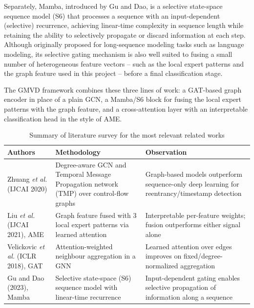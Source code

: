 \documentclass[12pt, a4paper, openright, twoside]{report}
\begin{document}
Separately, Mamba, introduced by Gu and Dao, is a selective state-space sequence model (S6) that processes a sequence with an input-dependent (selective) recurrence, achieving linear-time complexity in sequence length while retaining the ability to selectively propagate or discard information at each step. Although originally proposed for long-sequence modeling tasks such as language modeling, its selective gating mechanism is also well suited to fusing a small number of heterogeneous feature vectors -- such as the local expert patterns and the graph feature used in this project -- before a final classification stage.

The GMVD framework combines these three lines of work: a GAT-based graph encoder in place of a plain GCN, a Mamba/S6 block for fusing the local expert patterns with the graph feature, and a cross-attention layer with an interpretable classification head in the style of AME.

\begin{table}[h!]
\centering
\caption{Summary of literature survey for the most relevant related works}
\begin{tabular}{|p{3.6cm}|p{6cm}|p{4.5cm}|}
\hline
\textbf{Authors} & \textbf{Methodology} & \textbf{Observation} \\
\hline
Zhuang \textit{et al.} (IJCAI 2020) & Degree-aware GCN and Temporal Message Propagation network (TMP) over control-flow graphs & Graph-based models outperform sequence-only deep learning for reentrancy/timestamp detection \\
\hline
Liu \textit{et al.} (IJCAI 2021), AME & Graph feature fused with 3 local expert patterns via learned attention & Interpretable per-feature weights; fusion outperforms either signal alone \\
\hline
Velickovic \textit{et al.} (ICLR 2018), GAT & Attention-weighted neighbour aggregation in a GNN & Learned attention over edges improves on fixed/degree-normalized aggregation \\
\hline
Gu and Dao (2023), Mamba & Selective state-space (S6) sequence model with linear-time recurrence & Input-dependent gating enables selective propagation of information along a sequence \\
\hline
\end{tabular}
\label{littab}
\end{table}
\end{document}
